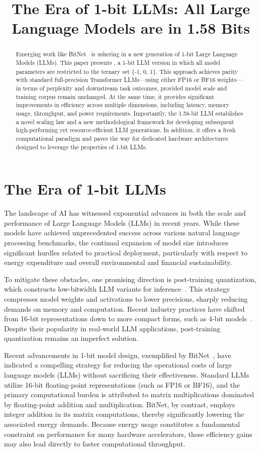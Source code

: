 \title{The Era of 1-bit LLMs: All Large Language Models are in 1.58 Bits}

\begin{abstract}
Emerging work like BitNet~\cite{bitnet} is ushering in a new generation of 1-bit Large Language Models (LLMs). This paper presents \textbf{}, a 1-bit LLM version in which all model parameters are restricted to the ternary set \{-1, 0, 1\}. This approach achieves parity with standard full-precision Transformer LLMs—using either FP16 or BF16 weights—in terms of perplexity and downstream task outcomes, provided model scale and training corpus remain unchanged. At the same time, it provides significant improvements in efficiency across multiple dimensions, including latency, memory usage, throughput, and power requirements. Importantly, the 1.58-bit LLM establishes a novel scaling law and a new methodological framework for developing subsequent high-performing yet resource-efficient LLM generations. In addition, it offers a fresh computational paradigm and paves the way for dedicated hardware architectures designed to leverage the properties of 1-bit LLMs.
\end{abstract}

\section{The Era of 1-bit LLMs}

The landscape of AI has witnessed exponential advances in both the scale and performance of Large Language Models (LLMs) in recent years. While these models have achieved unprecedented success across various natural language processing benchmarks, the continual expansion of model size introduces significant hurdles related to practical deployment, particularly with respect to energy expenditure and overall environmental and financial sustainability.

To mitigate these obstacles, one promising direction is post-training quantization, which constructs low-bitwidth LLM variants for inference~\cite{smoothquant, gptq, quip, quip_sharp}. This strategy compresses model weights and activations to lower precisions, sharply reducing demands on memory and computation. Recent industry practices have shifted from 16-bit representations down to more compact forms, such as 4-bit models~\cite{gptq, awq}. Despite their popularity in real-world LLM applications, post-training quantization remains an imperfect solution.

Recent advancements in 1-bit model design, exemplified by BitNet~\cite{bitnet}, have indicated a compelling strategy for reducing the operational costs of large language models (LLMs) without sacrificing their effectiveness. Standard LLMs utilize 16-bit floating-point representations (such as FP16 or BF16), and the primary computational burden is attributed to matrix multiplications dominated by floating-point addition and multiplication. BitNet, by contrast, employs integer addition in its matrix computations, thereby significantly lowering the associated energy demands. Because energy usage constitutes a fundamental constraint on performance for many hardware accelerators, these efficiency gains may also lead directly to faster computational throughput.

